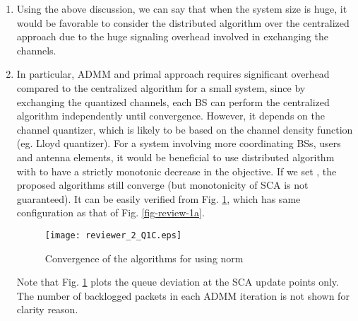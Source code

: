 \begin{enumerate}
\begin{enumerate}
		In this example, for the same amount of signaling overhead as in centralized method, we can performance only up to 6 SCA updates for  (\textit{i.e.}, two updates for ADMM part). This may not be sufficient for the distributed algorithms to attain the same performance as the centralized method. However, as the number of sub-channels, users and/or the antenna element increases, it may not be a feasible option to feedback the \ac{CSI} across the coordinating \acp{BS} to the centralized controller. In addition to comparing the signaling overhead, we also need to consider the effects of the quantization of the \ac{CSI} on the performance of a centralized algorithm, which is beyond the scope of our paper. Generally, the performance is significantly degraded if the \ac{CSI} is quantized \cite{nam_robust}. Moreover, in the centralized algorithm, resulting transmit precoders need to be exchanged with the corresponding \acp{BS} before the actual transmission, involving huge overhead in the backhaul.
		
		\item Using the above discussion, we can say that when the system size is huge, it would be favorable to consider the distributed algorithm over the centralized approach due to the huge signaling overhead involved in exchanging the channels.
		
		\item In particular, \ac{ADMM} and primal approach requires significant overhead compared to the centralized algorithm for a small system, since by exchanging the quantized channels, each \ac{BS} can perform the centralized algorithm independently until convergence. However, it depends on the channel quantizer, which is likely to be based on the channel density function (eg. Lloyd quantizer). For a system involving more coordinating \acp{BS}, users and antenna elements, it would be beneficial to use distributed algorithm with  to have a strictly monotonic decrease in the objective. If we set , the proposed algorithms still converge (but monotonicity of SCA is not guaranteed). It can be easily verified from Fig. \ref{fig-review-2-a}, which has same configuration as that of Fig. \ref{fig-review-1a}.
		\begin{figure}[h!]
			\centering
			\texttt{[image: reviewer\_2\_Q1C.eps]}
			\caption{Convergence of the algorithms for  using  norm}
			\label{fig-review-2-a}
		\end{figure}
		Note that Fig. \ref{fig-review-2-a} plots the queue deviation at the \ac{SCA} update points only. The number of backlogged packets in each \ac{ADMM} iteration is not shown for clarity reason.		
		

\end{enumerate}
\end{enumerate}
